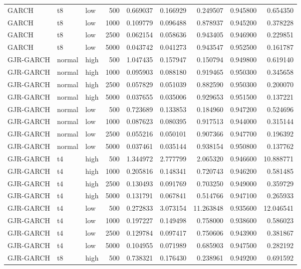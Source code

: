 \begin{tabular}{lllrrrrrr}
GARCH & t8 & low & 500 & 0.669037 & 0.166929 & 0.249507 & 0.945800 & 0.654350 \\
GARCH & t8 & low & 1000 & 0.109779 & 0.096488 & 0.878937 & 0.945200 & 0.378228 \\
GARCH & t8 & low & 2500 & 0.062154 & 0.058636 & 0.943405 & 0.946900 & 0.229851 \\
GARCH & t8 & low & 5000 & 0.043742 & 0.041273 & 0.943547 & 0.952500 & 0.161787 \\
GJR-GARCH & normal & high & 500 & 1.047435 & 0.157947 & 0.150794 & 0.949800 & 0.619140 \\
GJR-GARCH & normal & high & 1000 & 0.095903 & 0.088180 & 0.919465 & 0.950300 & 0.345658 \\
GJR-GARCH & normal & high & 2500 & 0.057829 & 0.051039 & 0.882590 & 0.950300 & 0.200070 \\
GJR-GARCH & normal & high & 5000 & 0.037655 & 0.035006 & 0.929653 & 0.951500 & 0.137221 \\
GJR-GARCH & normal & low & 500 & 0.723689 & 0.133853 & 0.184960 & 0.947200 & 0.524696 \\
GJR-GARCH & normal & low & 1000 & 0.087623 & 0.080395 & 0.917513 & 0.944000 & 0.315144 \\
GJR-GARCH & normal & low & 2500 & 0.055216 & 0.050101 & 0.907366 & 0.947700 & 0.196392 \\
GJR-GARCH & normal & low & 5000 & 0.037461 & 0.035144 & 0.938154 & 0.950800 & 0.137762 \\
GJR-GARCH & t4 & high & 500 & 1.344972 & 2.777799 & 2.065320 & 0.946600 & 10.888771 \\
GJR-GARCH & t4 & high & 1000 & 0.205816 & 0.148341 & 0.720743 & 0.946200 & 0.581485 \\
GJR-GARCH & t4 & high & 2500 & 0.130493 & 0.091769 & 0.703250 & 0.949000 & 0.359729 \\
GJR-GARCH & t4 & high & 5000 & 0.131791 & 0.067841 & 0.514766 & 0.947100 & 0.265933 \\
GJR-GARCH & t4 & low & 500 & 0.272833 & 3.073154 & 11.263848 & 0.935600 & 12.046541 \\
GJR-GARCH & t4 & low & 1000 & 0.197227 & 0.149498 & 0.758000 & 0.938600 & 0.586023 \\
GJR-GARCH & t4 & low & 2500 & 0.129784 & 0.097417 & 0.750606 & 0.943900 & 0.381867 \\
GJR-GARCH & t4 & low & 5000 & 0.104955 & 0.071989 & 0.685903 & 0.947500 & 0.282192 \\
GJR-GARCH & t8 & high & 500 & 0.738321 & 0.176430 & 0.238961 & 0.949200 & 0.691592 \\

\end{tabular}
